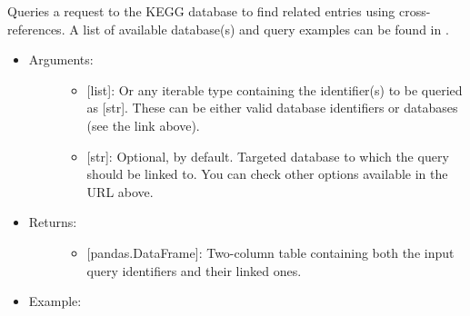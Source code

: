 \documentclass[letterpaper,10pt,english]{sphinxmanual}
\begin{document}
\begin{fulllineitems}
\label{\detokenize{databases:data_tools.databases.kegg_link}}
Queries a request to the KEGG database to find related entries using
cross-references. A list of available database(s) and query examples
can be found in .
\begin{itemize}
\item {} \begin{description}
\item[{Arguments:}] \leavevmode\begin{itemize}
\item {} 
 {[}list{]}: Or any iterable type containing the
identifier(s) to be queried as {[}str{]}. These can be either
valid database identifiers or databases  (see the link
above).

\item {} 
 {[}str{]}: Optional,  by default. Targeted
database to which the query should be linked to. You can check
other options available in the URL above.

\end{itemize}

\end{description}

\item {} \begin{description}
\item[{Returns:}] \leavevmode\begin{itemize}
\item {} 
{[}pandas.DataFrame{]}: Two-column table containing both the
input query identifiers and their linked ones.

\end{itemize}

\end{description}

\item {} \begin{description}
\item[{Example:}] \leavevmode
{}%
\begin{sphinxVerbatim}[commandchars=\\\{\}]
  \PYG{p}{[} \PYG{p}{]}
\end{sphinxVerbatim}


\end{description}
\end{itemize}
\end{fulllineitems}
\end{document}
